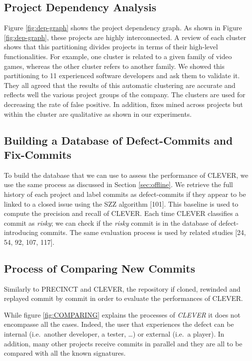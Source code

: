 \documentclass[12pt]{report}
\begin{document}
\subsection{Project Dependency Analysis}\label{sec:dependencies}

Figure \ref{fig:dep-graph} shows the project dependency graph. As shown
in Figure \ref{fig:dep-graph}, these projects are highly interconnected.
A review of each cluster shows that this partitioning divides projects
in terms of their high-level functionalities. For example, one cluster
is related to a given family of video games, whereas the other cluster
refers to another family. We showed this partitioning to 11 experienced
software developers and ask them to validate it. They all agreed that
the results of this automatic clustering are accurate and reflects well
the various project groups of the company. The clusters are used for
decreasing the rate of false positive. In addition, fixes mined across
projects but within the cluster are qualitative as shown in our
experiments.

\subsection{Building a Database of Defect-Commits and
Fix-Commits}\label{sub:golden}

To build the database that we can use to assess the performance of
CLEVER, we use the same process as discussed in Section
\ref{sec:offline}. We retrieve the full history of each project and
label commits as defect-commits if they appear to be linked to a closed
issue using the SZZ algorithm {[}101{]}. This baseline is used to
compute the precision and recall of CLEVER. Each time CLEVER classifies
a commit as \emph{risky}; we can check if the \emph{risky} commit is in
the database of defect-introducing commits. The same evaluation process
is used by related studies {[}24, 54, 92, 107, 117{]}.

\subsection{Process of Comparing New Commits}\label{sec:newcommits}



Similarly to PRECINCT and CLEVER, the repository if cloned, rewinded and
replayed commit by commit in order to evaluate the performances of
CLEVER.

While figure \ref{fig:COMPARING} explains the processes of \emph{CLEVER}
it does not encompasse all the cases. Indeed, the user that experiences
the defect can be internal (i.e.~another developer, a tester, \ldots{})
or external (i.e.~a player). In addition, many other projects receive
commits in parallel and they are all to be compared with all the known
signatures.
\end{document}
